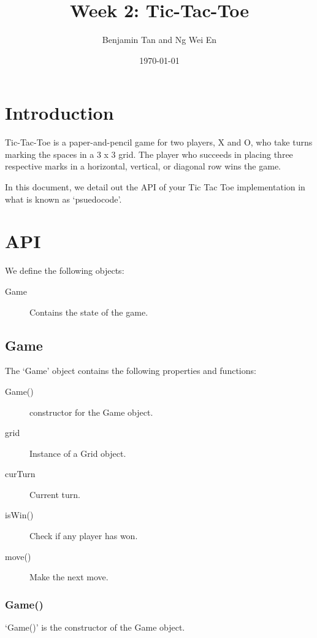 \documentclass{article}
\title{Week 2: Tic-Tac-Toe}
\author{Benjamin Tan and Ng Wei En}
\date{\today}
\begin{document}
\maketitle

\section{Introduction}

Tic-Tac-Toe is a paper-and-pencil game for two players, X and O, who take turns marking the spaces in a 3 x 3 grid. The player who succeeds in placing three respective marks in a horizontal, vertical, or diagonal row wins the game.

In this document, we detail out the API of your Tic Tac Toe implementation in what is known as `psuedocode'.

\section{API}

We define the following objects:

\begin{description}
  \item[Game] Contains the state of the game.
\end{description}

\subsection{Game}

The `Game' object contains the following properties and functions:

\begin{description}
  \item[Game()] constructor for the Game object.

  \item[grid] Instance of a Grid object.
  \item[curTurn] Current turn.

  \item[isWin()] Check if any player has won.
  \item[move()] Make the next move.
\end{description}

\subsubsection{Game()}

`Game()' is the constructor of the Game object.
\end{document}
